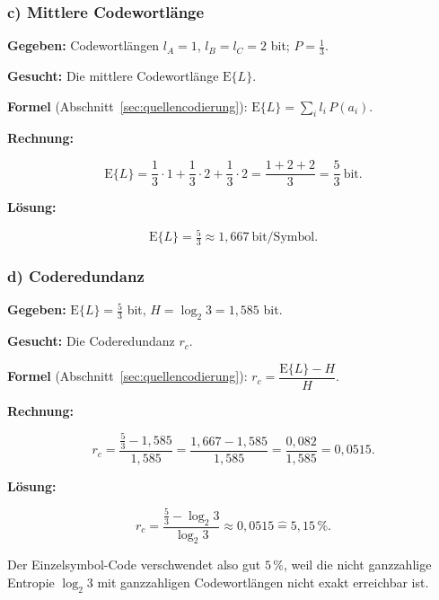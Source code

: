 \subsubsection*{c) Mittlere Codewortlänge}

\begin{beispiel}

\textbf{Gegeben:} Codewortlängen $l_A = 1$, $l_B = l_C = 2$ bit; $P = \tfrac13$.

\textbf{Gesucht:} Die mittlere Codewortlänge $\mathrm{E}\{L\}$.

\textbf{Formel} (Abschnitt~\ref{sec:quellencodierung}):
$\mathrm{E}\{L\} = \sum_i l_i\,P(a_i)$.

\textbf{Rechnung:}

$$
\mathrm{E}\{L\} = \frac13\cdot 1 + \frac13\cdot 2 + \frac13\cdot 2
= \frac{1+2+2}{3} = \frac{5}{3}\ \text{bit}.
$$

\textbf{Lösung:}

$$
\boxed{\;\mathrm{E}\{L\} = \tfrac{5}{3} \approx 1{,}667\ \text{bit/Symbol}.\;}
$$

\end{beispiel}

\subsubsection*{d) Coderedundanz}

\begin{beispiel}

\textbf{Gegeben:} $\mathrm{E}\{L\} = \tfrac53$ bit, $H = \log_2 3 = 1{,}585$ bit.

\textbf{Gesucht:} Die Coderedundanz $r_c$.

\textbf{Formel} (Abschnitt~\ref{sec:quellencodierung}):
$r_c = \dfrac{\mathrm{E}\{L\} - H}{H}$.

\textbf{Rechnung:}

$$
r_c = \frac{\tfrac53 - 1{,}585}{1{,}585}
= \frac{1{,}667 - 1{,}585}{1{,}585}
= \frac{0{,}082}{1{,}585} = 0{,}0515.
$$

\textbf{Lösung:}

$$
\boxed{\;r_c = \frac{\tfrac53 - \log_2 3}{\log_2 3} \approx 0{,}0515
\mathrel{\widehat{=}} 5{,}15\,\%.\;}
$$

Der Einzelsymbol-Code verschwendet also gut $5\,\%$, weil die nicht ganzzahlige
Entropie $\log_2 3$ mit ganzzahligen Codewortlängen nicht exakt erreichbar ist.

\end{beispiel}

